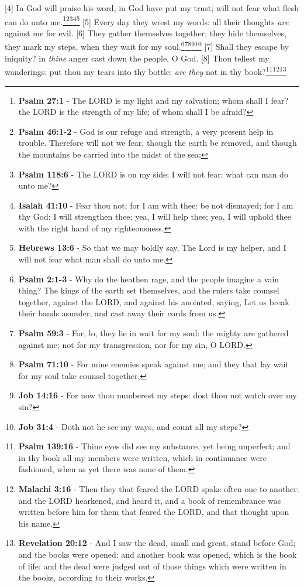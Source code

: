 [4] \textcolor[cmyk]{0.99998,1,0,0}{In God  will praise his word, in God  have put my trust;  will not fear what flesh can do unto me.}\footnote{\textbf{Psalm 27:1} - The LORD is my light and my salvation; whom shall I fear? the LORD is the strength of my life; of whom shall I be afraid?}\footnote{\textbf{Psalm 46:1-2} - God is our refuge and strength, a very present help in trouble. Therefore will not we fear, though the earth be removed, and though the mountains be carried into the midst of the sea;}\footnote{\textbf{Psalm 118:6} - The LORD is on my side; I will not fear: what can man do unto me?}\footnote{\textbf{Isaiah 41:10} - Fear thou not; for I am with thee: be not dismayed; for I am thy God: I will strengthen thee; yea, I will help thee; yea, I will uphold thee with the right hand of my righteousness.}\footnote{\textbf{Hebrews 13:6} - So that we may boldly say, The Lord is my helper, and I will not fear what man shall do unto me.}
[5] \textcolor[cmyk]{0.99998,1,0,0}{Every day they wrest my words: all their thoughts \emph{are} against me for evil.}
[6] \textcolor[cmyk]{0.99998,1,0,0}{They gather themselves together, they hide themselves, they mark my steps, when they wait for my soul.}\footnote{\textbf{Psalm 2:1-3} - Why do the heathen rage, and the people imagine a vain thing? The kings of the earth set themselves, and the rulers take counsel together, against the LORD, and against his anointed, saying, Let us break their bands asunder, and cast away their cords from us.}\footnote{\textbf{Psalm 59:3} - For, lo, they lie in wait for my soul: the mighty are gathered against me; not for my transgression, nor for my sin, O LORD.}\footnote{\textbf{Psalm 71:10} - For mine enemies speak against me; and they that lay wait for my soul take counsel together,}\footnote{\textbf{Job 14:16} - For now thou numberest my steps: dost thou not watch over my sin?}\footnote{\textbf{Job 31:4} - Doth not he see my ways, and count all my steps?}
[7] \textcolor[cmyk]{0.99998,1,0,0}{Shall they escape by iniquity? in \emph{thine} anger cast down the people, O God.}
[8] \textcolor[cmyk]{0.99998,1,0,0}{Thou tellest my wanderings: put thou my tears into thy bottle: \emph{are} \emph{they} not in thy book?}\footnote{\textbf{Psalm 139:16} - Thine eyes did see my substance, yet being unperfect; and in thy book all my members were written, which in continuance were fashioned, when as yet there was none of them.}\footnote{\textbf{Malachi 3:16} - Then they that feared the LORD spake often one to another: and the LORD hearkened, and heard it, and a book of remembrance was written before him for them that feared the LORD, and that thought upon his name.}\footnote{\textbf{Revelation 20:12} - And I saw the dead, small and great, stand before God; and the books were opened: and another book was opened, which is the book of life: and the dead were judged out of those things which were written in the books, according to their works.}
